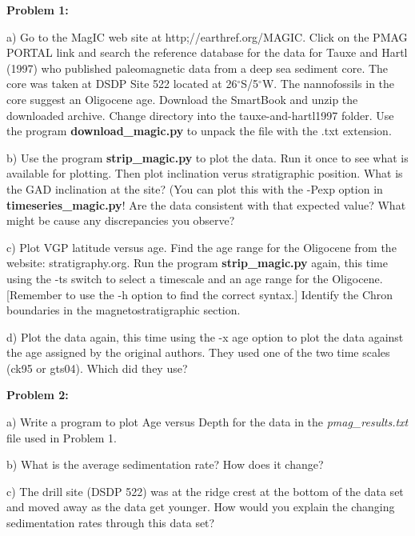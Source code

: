 {\parindent 0pt  \parskip 12pt

{\bf Problem 1: }

a) Go to the MagIC web site at http;//earthref.org/MAGIC.  Click on the PMAG PORTAL
link and search the reference database for the data for Tauxe and Hartl (1997) \nocite{tauxe97} who published paleomagnetic data from a deep sea sediment core.   The core was taken at DSDP Site 522 located at  26$^{\circ}$S/5$^{\circ}$W.  The nannofossils in the core suggest an Oligocene age.   Download the SmartBook and unzip the downloaded archive.  Change directory into the tauxe-and-hartl1997 folder.   Use the program {\bf download\_magic.py} to unpack the file with the .txt extension.  

b) Use the program {\bf strip\_magic.py} to plot the data.  Run it once to see what is available for plotting.  Then plot inclination verus stratigraphic position.  
 What is the GAD inclination at the site?  (You can plot this with the -Pexp option in {\bf timeseries\_magic.py}!     Are the data consistent with that expected value?   What might be cause any discrepancies you observe?    

c) Plot VGP latitude versus age.  
 Find the age range for the Oligocene from the website: stratigraphy.org.  Run the program {\bf strip\_magic.py} again, this time using the -ts switch to select a timescale and an age range for the Oligocene. [Remember to use the -h option to find the correct syntax.]     Identify the Chron boundaries in the magnetostratigraphic section.   

d) Plot the data again, this time using the -x age option to plot the data against the age assigned by the original authors.   They used one of the two time scales (ck95 or gts04).  Which did they use?  

{\bf Problem 2:}

a) Write a program to plot Age versus Depth for the data in the {\it pmag\_results.txt} file used in Problem 1.  

b) What is the average sedimentation rate?  How does it change? 

c) The drill site (DSDP 522) was at the ridge crest  at the bottom of the data set and moved away as the data get younger.  How would you explain the changing sedimentation rates through this data set? 


}

